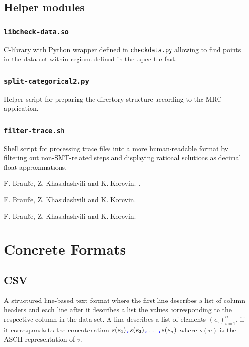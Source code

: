 \documentclass[a4paper,parskip=half]{article} %
\newcommand*\cmdstyle\texttt
\newcommand*\file\cmdstyle
\newcommand*\literalColor{blue}
\newcommand*\cmd[1]{\cmdstyle{\textcolor{red!85!black}{#1}}}
\newcommand*\literal[1]{\textcolor{\literalColor}{\cmdstyle{#1}}}
\begin{document}
\subsection{Helper modules}
\subsubsection{\file{libcheck-data.so}}
C-library with Python wrapper defined in \file{checkdata.py} allowing to find
points in the data set within regions defined in the .spec file fast.

\subsubsection{\cmd{split-categorical2.py}}
Helper script for preparing the directory structure according to the MRC
application.

\subsubsection{\cmd{filter-trace.sh}}
Shell script for processing trace files into a more human-readable format by
filtering out non-SMT-related steps and displaying rational solutions as
decimal float approximations.


\begin{thebibliography}{99}
 F. Brauße, Z. Khasidashvili and K. Korovin.
.

 F. Brauße, Z. Khasidashvili and K. Korovin.


 F. Brauße, Z. Khasidashvili and K. Korovin.
\end{thebibliography}


\appendix
\section{Concrete Formats}
\subsection{CSV}\label{sec:csv}
A structured line-based text format where the first line describes a
list of column headers and each line after it describes a list the
values corresponding to the respective column in the data set.
A line describes a list of elements $(e_i)_{i=1}^n$, if it corresponds
to the concatenation
$s(e_1)\literal,s(e_2)\literal,\ldots\literal,s(e_n)$
where $s(v)$ is the ASCII representation of $v$.
\end{document}
